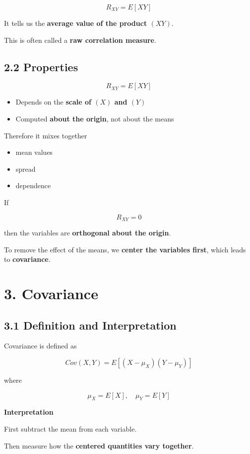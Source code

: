 \documentclass[12pt]{article}
\begin{document}
\[
R_{XY} = E[XY]
\]

It tells us the \textbf{average value of the product $(XY)$}.

This is often called a \textbf{raw correlation measure}.

\subsection*{2.2 Properties}

\[
R_{XY} = E[XY]
\]

\begin{itemize}
\item Depends on the \textbf{scale of $(X)$ and $(Y)$}
\item Computed \textbf{about the origin}, not about the means
\end{itemize}

Therefore it mixes together

\begin{itemize}
\item mean values
\item spread
\item dependence
\end{itemize}

If

\[
R_{XY}=0
\]

then the variables are \textbf{orthogonal about the origin}.

To remove the effect of the means, we \textbf{center the variables first}, which leads to \textbf{covariance}.

\section*{3. Covariance}

\subsection*{3.1 Definition and Interpretation}

Covariance is defined as

\[
Cov(X,Y)=E[(X-\mu_X)(Y-\mu_Y)]
\]

where

\[
\mu_X = E[X], \quad \mu_Y = E[Y]
\]

\textbf{Interpretation}

First subtract the mean from each variable.

Then measure how the \textbf{centered quantities vary together}.
\end{document}
